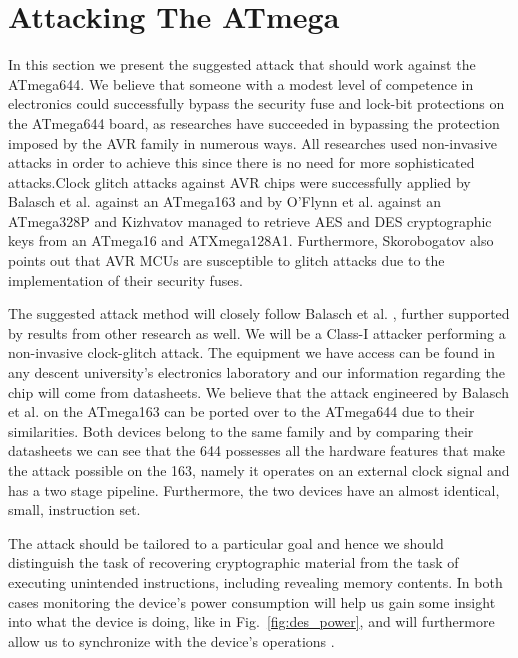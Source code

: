 \section{Attacking The ATmega}
\label{sec:attacking_mega}

In this section we present the suggested attack that should work against the ATmega644. We believe that someone with a modest level of competence in electronics could successfully bypass the security fuse and lock-bit protections on the ATmega644 board, as researches have succeeded in bypassing the protection imposed by the AVR family in numerous ways. All researches used non-invasive attacks in order to achieve this since there is no need for more sophisticated attacks.Clock glitch attacks against AVR chips were successfully applied by Balasch et al. \citep{glitches_paper} against an ATmega163 and by O'Flynn et al. \citep{chipwhisperer} against an ATmega328P and Kizhvatov \citep{avr_mega} managed to retrieve AES and DES cryptographic keys from an ATmega16 and ATXmega128A1. Furthermore, Skorobogatov \citep{sergei:thesis} also points out that AVR MCUs are susceptible to glitch attacks due to the implementation of their security fuses. 

The suggested attack method will closely follow Balasch et al. \citep{glitches_paper}, further supported by results from other research as well. We will be a Class-I attacker performing a non-invasive clock-glitch attack. The equipment we have access can be found in any descent university's electronics laboratory and our information regarding the chip will come from datasheets. We believe that the attack engineered by Balasch et al. \citep{glitches_paper} on the ATmega163 can be ported over to the ATmega644 due to their similarities. Both devices belong to the same family and by comparing their datasheets we can see that the 644 possesses all the hardware features that make the attack possible on the 163, namely it operates on an external clock signal and has a two stage pipeline\citep{glitches_paper}. Furthermore, the two devices have an almost identical, small, instruction set.

The attack should be tailored to a particular goal and hence we should distinguish the task of recovering cryptographic material from the task of executing unintended instructions, including revealing memory contents. In both cases monitoring the device's power consumption will help us gain some insight into what the device is doing, like in Fig.~\ref{fig:des_power}, and will furthermore allow us to synchronize with the device's operations \citep{sergei:thesis}\citep{avr_mega}. 

